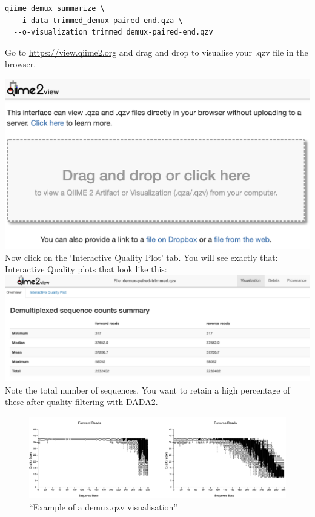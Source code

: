 \documentclass[
]{book}
\begin{document}
\begin{verbatim}
qiime demux summarize \
  --i-data trimmed_demux-paired-end.qza \
  --o-visualization trimmed_demux-paired-end.qzv
\end{verbatim}

Go to \url{https://view.qiime2.org} and drag and drop to visualise your .qzv file in the browser.

\includegraphics{./img/viewqiime.png}\\

Now click on the `Interactive Quality Plot' tab. You will see exactly that: Interactive Quality plots that look like this:\\
\includegraphics{./img/demux.qza1.png}\\
Note the total number of sequences. You want to retain a high percentage of these after quality filtering with DADA2.

\begin{figure}
\centering
\includegraphics{./img/demux.qza.png}
\caption{``Example of a demux.qzv visualisation''}
\end{figure}
\end{document}
